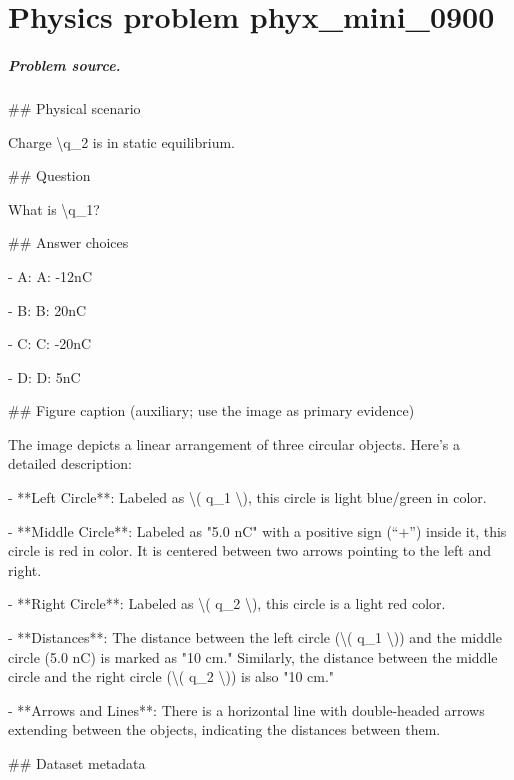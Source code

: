 
\chapter{Physics problem phyx\_mini\_0900}
\label{ch:PhyXMiniProblems_problem_phyx_mini_0900}

\paragraph{Problem source.}
\#\# Physical scenario

Charge \textbackslash{}q\_2 is in static equilibrium.

\#\# Question

What is \textbackslash{}q\_1?

\#\# Answer choices

- A: A: -12nC

- B: B: 20nC

- C: C: -20nC

- D: D: 5nC

\#\# Figure caption (auxiliary; use the image as primary evidence)

The image depicts a linear arrangement of three circular objects. Here's a detailed description:

- **Left Circle**: Labeled as \textbackslash{}( q\_1 \textbackslash{}), this circle is light blue/green in color.

- **Middle Circle**: Labeled as "5.0 nC" with a positive sign (“+”) inside it, this circle is red in color. It is centered between two arrows pointing to the left and right.

- **Right Circle**: Labeled as \textbackslash{}( q\_2 \textbackslash{}), this circle is a light red color.

- **Distances**: The distance between the left circle (\textbackslash{}( q\_1 \textbackslash{})) and the middle circle (5.0 nC) is marked as "10 cm." Similarly, the distance between the middle circle and the right circle (\textbackslash{}( q\_2 \textbackslash{})) is also "10 cm."

- **Arrows and Lines**: There is a horizontal line with double-headed arrows extending between the objects, indicating the distances between them.

\#\# Dataset metadata

